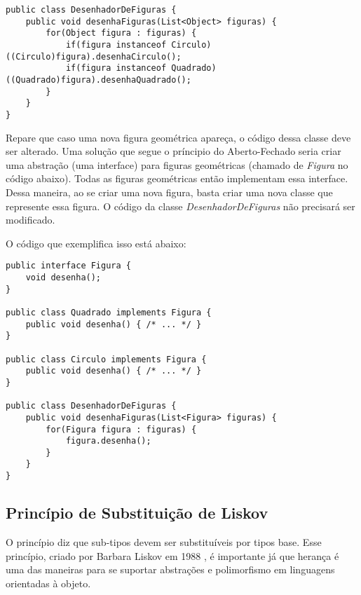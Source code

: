 \begin{lstlisting}[frame=trbl]
public class DesenhadorDeFiguras {
	public void desenhaFiguras(List<Object> figuras) {
		for(Object figura : figuras) {
			if(figura instanceof Circulo) ((Circulo)figura).desenhaCirculo();
			if(figura instanceof Quadrado) ((Quadrado)figura).desenhaQuadrado();
		}
	}
}
\end{lstlisting}

Repare que caso uma nova figura geométrica apareça, o código dessa classe deve ser alterado. Uma solução que segue
o príncipio do Aberto-Fechado seria criar uma abstração (uma interface) para figuras geométricas (chamado de \textit{Figura} no código abaixo).
Todas as figuras geométricas então implementam essa interface. Dessa maneira, ao se criar uma nova figura, basta criar uma nova classe
que represente essa figura. O código da classe \textit{DesenhadorDeFiguras} não precisará ser modificado.

O código que exemplifica isso está abaixo:

\begin{lstlisting}[frame=trbl]
public interface Figura {
	void desenha();
}

public class Quadrado implements Figura {
	public void desenha() { /* ... */ }
}

public class Circulo implements Figura {
	public void desenha() { /* ... */ }
}

public class DesenhadorDeFiguras {
	public void desenhaFiguras(List<Figura> figuras) {
		for(Figura figura : figuras) {
			figura.desenha();
		}
	}
}
\end{lstlisting}

\subsection{Princípio de Substituição de Liskov}
\label{subsec:lsp}

O princípio diz que sub-tipos devem ser substituíveis por tipos base. Esse princípio, criado por Barbara Liskov em 1988 \cite{liskov},
é importante já que herança é uma das maneiras para se suportar abstrações e polimorfismo em linguagens orientadas à objeto.

